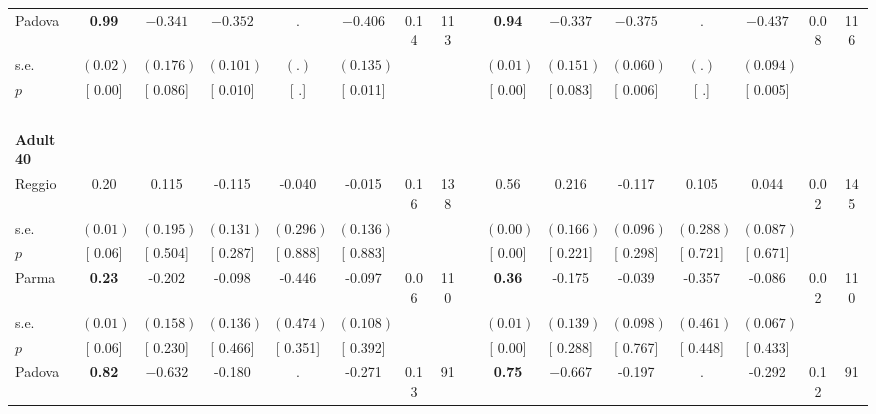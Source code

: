 \begin{longtable}{L{8em} c c c c c c c p{1em} c c c c c c c}
\quad \quad \quad Padova& \textbf{     0.99} & $ \mathbf{   -0.341}$ & $ \mathbf{   -0.352}$ &         . & $ \mathbf{   -0.406}$ &      0.14 &       113 & & \textbf{     0.94} & $ \mathbf{   -0.337}$ & $ \mathbf{   -0.375}$ &         . & $ \mathbf{   -0.437}$ &      0.08 &       116  \\*
\quad \quad \quad \quad s.e.& $ (     0.02)$ & $ (    0.176)$ & $ (    0.101)$ & $ (        .)$ & $ (    0.135)$ & & & & $ (     0.01)$ & $ (    0.151)$ & $ (    0.060)$ & $ (        .)$ & $ (    0.094)$ & &  \\*
\quad \quad \quad \quad $ p$ & [     0.00] & [    0.086] & [    0.010] & [        .] & [    0.011] & & & & [     0.00] & [    0.083] & [    0.006] & [        .] & [    0.005] & &  \\[1em]
~\\[1em]
\quad \quad \textbf{Adult 40} & & & & & & & & & & & & & & & \\* 
\quad \quad \quad Reggio& 0.20 &     0.115 &    -0.115 &    -0.040 &    -0.015 &      0.16 &       138 & & 0.56 &     0.216 &    -0.117 &     0.105 &     0.044 &      0.02 &       145  \\*
\quad \quad \quad \quad s.e.& $ (     0.01)$ & $ (    0.195)$ & $ (    0.131)$ & $ (    0.296)$ & $ (    0.136)$ & & & & $ (     0.00)$ & $ (    0.166)$ & $ (    0.096)$ & $ (    0.288)$ & $ (    0.087)$ & &  \\*
\quad \quad \quad \quad $ p$ & [     0.06] & [    0.504] & [    0.287] & [    0.888] & [    0.883] & & & & [     0.00] & [    0.221] & [    0.298] & [    0.721] & [    0.671] & &  \\[1em]
\quad \quad \quad Parma& \textbf{     0.23} &    -0.202 &    -0.098 &    -0.446 &    -0.097 &      0.06 &       110 & & \textbf{     0.36} &    -0.175 &    -0.039 &    -0.357 &    -0.086 &      0.02 &       110  \\*
\quad \quad \quad \quad s.e.& $ (     0.01)$ & $ (    0.158)$ & $ (    0.136)$ & $ (    0.474)$ & $ (    0.108)$ & & & & $ (     0.01)$ & $ (    0.139)$ & $ (    0.098)$ & $ (    0.461)$ & $ (    0.067)$ & &  \\*
\quad \quad \quad \quad $ p$ & [     0.06] & [    0.230] & [    0.466] & [    0.351] & [    0.392] & & & & [     0.00] & [    0.288] & [    0.767] & [    0.448] & [    0.433] & &  \\[1em]
\quad \quad \quad Padova& \textbf{     0.82} & $ \mathbf{   -0.632}$ &    -0.180 &         . &    -0.271 &      0.13 &        91 & & \textbf{     0.75} & $ \mathbf{   -0.667}$ &    -0.197 &         . &    -0.292 &      0.12 &        91  \\*

\end{longtable}
